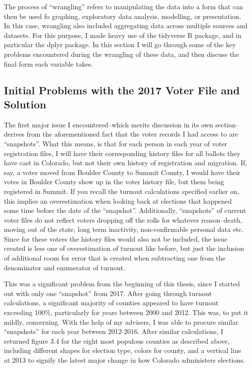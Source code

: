 \documentclass[12pt,twoside]{reedthesis}
\begin{document}
  The process of ``wrangling'' refers to manipulating the data into a form
  that can then be used fo graphing, exploratory data analysis, modelling,
  or presentation. In this case, wrangling also included aggregating data
  across multiple sources and datasets. For this purpose, I made heavy use
  of the tidyverse R package, and in particular the dplyr package. In this
  section I will go through some of the key problems encountered during
  the wrangling of these data, and then discuss the final form each
  variable takes.
  
  \subsection{Initial Problems with the 2017 Voter File and
  Solution}\label{initial-problems-with-the-2017-voter-file-and-solution}
  
  The first major issue I encountered--which merits discussion in its own
  section--derives from the aforementioned fact that the voter records I
  had access to are ``snapshots''. What this means, is that for each
  person in each year of voter registration files, I will have their
  corresponding history files for all ballots they have cast in Colorado,
  but not their own history of registration and migration. If, say, a
  voter moved from Boulder County to Summit County, I would have their
  votes in Boulder County show up in the voter history file, but them
  being registered in Summit. If you recall the turnout calculations
  specified earlier on, this implies an overestimation when looking back
  at elections that happened some time before the date of the
  ``snapshot''. Additionally, ``snapshots'' of current voter files do not
  reflect voters dropping off the rolls for whatever reason--death, moving
  out of the state, long term inactivity, non-confirmable personal data
  etc. Since for these voters the history files would also not be
  included, the issue created is less one of overestimation of turnout
  like before, but just the inclusion of additional room for error that is
  created when subtracting one from the denominator and enumerator of
  turnout.
  
  This was a significant problem from the beginning of this thesis, since
  I started out with only one ``snapshot'' from 2017. After going through
  turnout calculations, a significant majority of counties appeared to
  have turnout exceeding 100\%, particularly for years between 2000 and
  2012. This was, to put it mildly, concerning. With the help of my
  advisers, I was able to procure similar ``snapshots'' for each year
  between 2012-2016. After similar calculations, I returned figure 3.4 for
  the eight most populous counties as described above, including different
  shapes for election type, colors for county, and a vertical line at 2013
  to signify the latest major change in how Colorado administers
  elections.
  
\end{document}
